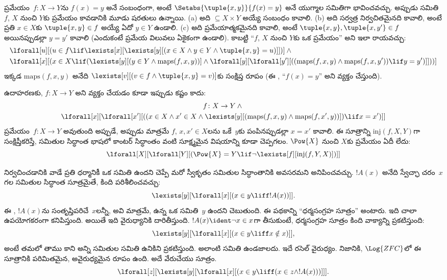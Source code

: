 \documentclass[../../../include/open-logic-section]{subfiles}
\begin{document}
ప్రమేయం~$f \colon X \to Y$ను $f(x)=y$ అనే సంబంధంగా, అంటే
$\Setabs{\tuple{x,y}}{f(x)=y}$ అనే యుగ్మాల సమితిగా భావించవచ్చు. అప్పుడు
సమితి~$f$, $X$ నుంచి $Y$కు ప్రమేయం కావడానికి మూడు షరతులు ఉన్నాయి. (a) అది
$\subseteq X \times Y$ అయ్యే సంబంధం కావాలి. (b) అది సర్వత్ర నిర్వచితమైనది
కావాలి, అంటే ప్రతి $x \in X$కు $\tuple{x,y}\in f$ అయ్యే ఏదో
$y \in Y$ ఉండాలి. (c) అది ప్రమేయాత్మకమైనది కావాలి, అంటే
$\tuple{x,y},\tuple{x,y'}\in f$ అయినప్పుడల్లా $y=y'$ కావాలి (ఎందుకంటే
ప్రమేయ విలువలు ఏకైకంగా ఉండాలి). కాబట్టి ``$f$, $X$ నుంచి $Y$కు ఒక
ప్రమేయం'' అని ఇలా రాయవచ్చు:
\begin{align*}
 & \lforall[u][(u \in f \lif \lexists[x][\lexists[y][(x \in X \land y \in
      Y \land \tuple{x, y} = u)]])] \land {}\\
 & \lforall[x][(x \in X \lif
      (\lexists[y][(y \in Y \land \mathrm{maps}(f, x, y))] \land
 \lforall[y][\lforall[y'][((\mathrm{maps}(f, x, y) \land
     \mathrm{maps}(f, x, y')) \lif y = y')]]))]
\end{align*}
ఇక్కడ $\mathrm{maps}(f,x,y)$ అనేది
$\lexists[v][(v \in f \land \tuple{x,y}=v)]$కు సంక్షిప్త రూపం (ఈ
, ``$f(x)=y$'' అని వ్యక్తం చేస్తుంది).

ఉదాహరణకు, $f\colon X\to Y$  అని వ్యక్తం చేయడం కూడా ఇప్పుడు
కష్టం కాదు:
\begin{multline*}
 f \colon X \to Y \land {}\\
 \lforall[x][\lforall[x'][((x \in X \land x' \in X \land
 \lexists[y][(\mathrm{maps}(f, x, y) \land \mathrm{maps}(f,
        x', y))]) \lif x = x')]]
\end{multline*}
ప్రమేయం~$f\colon X\to Y$  అవుతుంది అప్పుడే, అప్పుడు మాత్రమే
$f$, $x,x'\in X$లను ఒకే~$y$కు పంపినప్పుడల్లా $x=x'$ కావాలి. ఈ సూత్రాన్ని
$\mathrm{inj}(f,X,Y)$గా సంక్షిప్తీకరిస్తే, సమితుల సిద్ధాంత భాషలో
కాంటర్ సిద్ధాంతం వంటి సూక్ష్మమైన విషయాన్ని కూడా చెప్పగలం.
$\Pow{X}$ నుంచి $X$కు  ప్రమేయం ఏదీ లేదు:
\[
\lforall[X][\lforall[Y][(\Pow{X} = Y \lif
    \lnot\lexists[f][\mathrm{inj}(f, Y, X)])]]
\]

నిర్వచించడానికి వాడే ప్రతి ధర్మానికీ ఒక సమితి ఉందని చెప్పే మరో స్వీకృతం
సమితుల సిద్ధాంతానికి అవసరమని అనిపించవచ్చు. $!A(x)$ అనేది స్వేచ్ఛా
చరం~$x$ గల సమితుల సిద్ధాంత సూత్రమైతే, కింది 
పరిశీలించవచ్చు:
\[
\lexists[y][\lforall[x][(x \in y \liff !A(x))]].
\]
ఈ , $!A(x)$ను సంతృప్తిపరిచే~$x$లన్నీ, అవి మాత్రమే, 
ఉన్న ఒక సమితి~$y$ ఉందని చెబుతుంది. ఈ పథకాన్ని ``ధర్మసంగ్రహ సూత్రం''
అంటారు. ఇది చాలా ఉపయోగకరంగా కనిపిస్తుంది. అయితే ఇది
వైరుధ్యానికి దారితీస్తుంది. $!A(x) \ident \lnot x \in x$గా తీసుకుంటే,
ధర్మసంగ్రహ సూత్రం కింది వాక్యాన్ని ప్రకటిస్తుంది:
\[
\lexists[y][\lforall[x][(x \in y \liff x \notin x)]],
\]
అంటే తమలో తాము  కాని అన్ని సమితుల సమితి ఉనికిని
ప్రకటిస్తుంది. అలాంటి సమితి ఉండజాలదు. ఇదే రసెల్ వైరుధ్యం.
నిజానికి, $\Log{ZFC}$లో ఈ సూత్రానికి పరిమితమైన, అవైరుధ్యమైన
రూపం ఉంది. అదే వేరుచేయు సూత్రం.
\[
\lforall[z][\lexists[y][\lforall[x][(x \in y \liff (x \in z \land
      !A(x)))]]].
\]
\end{document}
